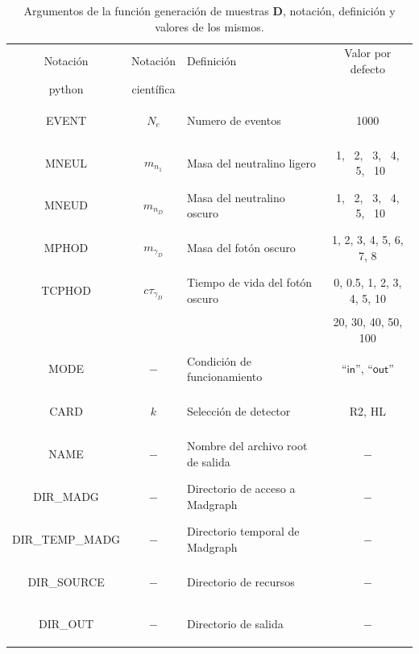 \begin{table}[!ht]
\begin{center}
\small
\begin{tabular}{|cclc|}
\toprule
Notación  & Notación  & Definición & Valor por defecto\\
python & científica  & & \\
\midrule
\begin{scriptsize}EVENT\end{scriptsize} & $N_e$ & Numero de eventos & 1000\\
\begin{scriptsize}MNEUL\end{scriptsize} & $m_{n_1}$ & Masa del neutralino ligero & 1, ~2, ~3, ~4, ~5, ~10\\
\begin{scriptsize}MNEUD\end{scriptsize} & $m_{n_D}$ & Masa del neutralino oscuro & 1, ~2, ~3, ~4, ~5, ~10\\
\begin{scriptsize}MPHOD\end{scriptsize} & $m_{\gamma_D}$ & Masa del fotón oscuro & 1, 2, 3, 4, 5, 6, 7, 8\\
\begin{scriptsize}TCPHOD\end{scriptsize} & $c\tau_{\gamma_D}$ & Tiempo de vida del fotón oscuro &0, 0.5, 1, 2, 3, 4, 5, 10\\
& & &20, 30, 40, 50, 100\\
\begin{scriptsize}MODE\end{scriptsize} & $-$ & Condición de funcionamiento & $\textsf{``in''}$, $\textsf{``out''}$\\
\begin{scriptsize}CARD\end{scriptsize} & $k$ & Selección de detector & R2, HL \\
\begin{scriptsize}NAME\end{scriptsize} & $-$ & Nombre del archivo root de salida & $-$\\
\begin{scriptsize}DIR\_MADG\end{scriptsize} & $-$ & Directorio de acceso a Madgraph & $-$\\
\begin{scriptsize}DIR\_TEMP\_MADG\end{scriptsize} & $-$ & Directorio temporal de Madgraph & $-$\\
\begin{scriptsize}DIR\_SOURCE\end{scriptsize} & $-$ & Directorio de recursos & $-$ \\
\begin{scriptsize}DIR\_OUT\end{scriptsize} & $-$ & Directorio de salida & $-$\\
\hline
\end{tabular}
\caption{Argumentos de la función generación de muestras \MSSM\textbf{D}, notación, definición y valores de los mismos.}
\label{table_genera_v5_value}
\end{center}
\end{table}
